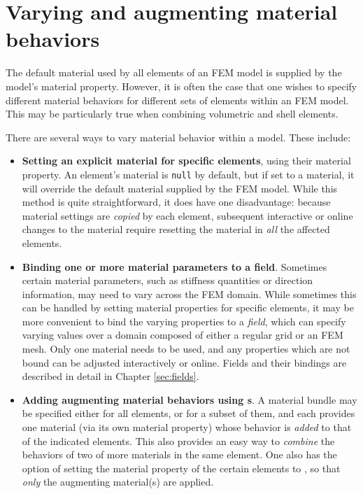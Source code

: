 \section{Varying and augmenting material behaviors}
\label{sec:augmentingMaterials}

The default material used by all elements of an FEM model is supplied
by the model's {\sf material} property.  However, it is often the case
that one wishes to specify different material behaviors for
different sets of elements within an FEM model. This may be
particularly true when combining volumetric and shell elements.

There are several ways to vary material behavior within a model.
These include:

\begin{itemize}

\item {\bf Setting an explicit material for specific elements}, using
their {\sf material} property.  An element's material is {\tt null} by
default, but if set to a material, it will override the
default material supplied by the FEM model. While this method is quite
straightforward, it does have one disadvantage: because material
settings are {\it copied} by each element, subsequent interactive or
online changes to the material require resetting the material in {\it all}
the affected elements.

\item {\bf Binding one or more material parameters to a field}.
Sometimes certain material parameters, such as stiffness quantities or
direction information, may need to vary across the FEM domain.  While
sometimes this can be handled by setting material properties for
specific elements, it may be more convenient to bind the varying
properties to a {\it field}, which can specify varying values over a
domain composed of either a regular grid or an FEM mesh.  Only one
material needs to be used, and any properties which are not bound can
be adjusted interactively or online. Fields and their bindings are
described in detail in Chapter \ref{sec:fields}.

\item {\bf Adding augmenting material behaviors using 
s}.  A material
bundle may be specified either for all elements, or for a subset of
them, and each provides one material (via its own {\sf material}
property) whose behavior is {\it added} to that of the indicated
elements. This also provides an easy way to {\it combine} the
behaviors of two of more materials in the same element.  One also has
the option of setting the {\sf material} property of the certain
elements to , so
that {\it only} the augmenting material(s) are applied.


\end{itemize}
